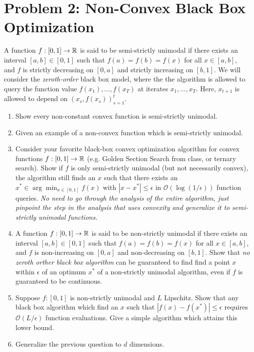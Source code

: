 \documentclass[12pt]{article}
\begin{document}
\section*{Problem 2: Non-Convex Black Box Optimization}
A function $f:[0,1] \to \mathbb{R}$ is said to be semi-strictly unimodal if there exists an interval $[a,b] \in [0,1]$ such that $f(a) = f(b) = f(x)$ for all $x \in [a,b]$, and $f$ is strictly decreasing on $[0,a]$ and strictly increasing on $[b,1]$. We will consider the \emph{zeroth-order} black box model, where the the algorithm is allowed to query the function value $f(x_1),\dots,f(x_T)$ at iterates $x_1,\dots,x_T$. Here, $x_{t+1}$ is allowed to depend on $(x_s,f(x_s))_{s=1}^t$. 
\begin{enumerate}
	\item Show every non-constant convex function is semi-strictly unimodal.
	\item Given an example of a non-convex function which is semi-strictly unimodal.
	\item Consider your favorite black-box convex optimization algorithm for convex functions $f:[0,1] \to \mathbb{R}$ (e.g. Golden Section Search from class, or ternary search). 
	Show if $f$ is only semi-strictly unimodal (but not necessarily convex), the algorithm still finds an $x$ such that there exists an $x^* \in \arg\min_{x \in [0,1]} f(x)$ with $|x-x^*| \le \epsilon$ in $\mathcal{O}(\log(1/\epsilon))$ function queries. 
	\emph{No need to go through the analysis of the entire algorithm, just pinpoint the step in the analysis that uses convexity and generalize it to semi-strictly unimodal functions.}
	\item A function $f:[0,1] \to \mathbb{R}$ is said to be non-strictly unimodal if there exists an interval $[a,b] \in [0,1]$ such that $f(a) = f(b) = f(x)$ for all $x \in [a,b]$, and $f$ is non-increasing on $[0,a]$ and non-decreasing on $[b,1]$. 
	Show that \emph{no zeroth orther black box algorithm} can be guaranteed to find find a point $x$ within $\epsilon$ of an optimum $x^*$ of a non-strictly unimodal algorithm, even if $f$ is guaranteed to be continuous. 
	\item Suppose $f: [0,1]$ is non-strictly unimodal and $L$ Lipschitz. Show that any black box algorithm which find an $x$ such that $|f(x)-f(x^*)| \le \epsilon$ requires $\mathcal{O}(L/\epsilon)$ function evaluations. Give a simple algorithm which attains this lower bound.
	\item Generalize the previous question to $d$ dimensions. 
\end{enumerate}
\end{document}

